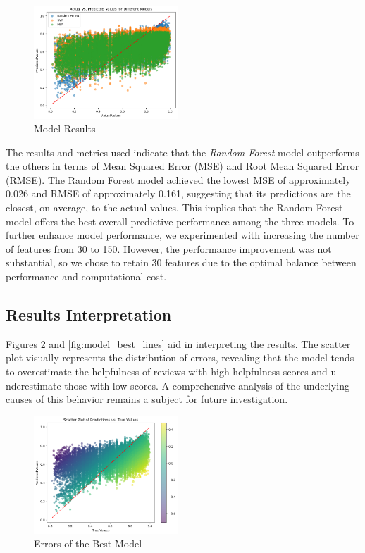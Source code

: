 \begin{figure}[H]
    \centering
    \includegraphics[width=0.48\textwidth]{./figures/model_results.png}
    \caption{Model Results}
    \label{fig:model_results}
\end{figure}

\noindent
The results and metrics used indicate that the \textit{Random Forest} model outperforms the others in terms of Mean Squared Error (MSE) 
and Root Mean Squared Error (RMSE). The Random Forest model achieved the lowest MSE of approximately 0.026 and RMSE of approximately 0.161, 
suggesting that its predictions are the closest, on average, to the actual values. This implies that the Random Forest model offers the 
best overall predictive performance among the three models. To further enhance model performance, we experimented with increasing the 
number of features from 30 to 150. However, the performance improvement was not substantial, so we chose to retain 30 features due to the 
optimal balance between performance and computational cost.

\subsection{Results Interpretation}
Figures \ref{fig:model_best_scatter} and \ref{fig:model_best_lines} aid in interpreting the results. The scatter plot visually represents 
the distribution of errors, revealing that the model tends to overestimate the helpfulness of reviews with high helpfulness scores and u
nderestimate those with low scores. A comprehensive analysis of the underlying causes of this behavior remains a subject for future investigation.

\begin{figure}[H]
    \centering
    \includegraphics[width=0.48\textwidth]{./figures/model_best_scatter.png}
    \caption{Errors of the Best Model}
    \label{fig:model_best_scatter}
\end{figure}

